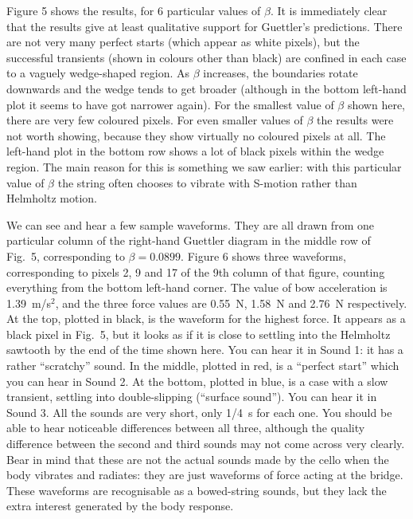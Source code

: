   Figure 5 shows the results, for 6 particular values of $\beta$. It is 
  immediately clear that the results give at least qualitative support for 
  Guettler's predictions. There are not very many perfect starts (which appear 
  as white pixels), but the successful transients (shown in colours other than 
  black) are confined in each case to a vaguely wedge-shaped region. As $\beta$ 
  increases, the boundaries rotate downwards and the wedge tends to get broader 
  (although in the bottom left-hand plot it seems to have got narrower again). 
  For the smallest value of $\beta$ shown here, there are very few coloured 
  pixels. For even smaller values of $\beta$ the results were not worth 
  showing, because they show virtually no coloured pixels at all. The left-hand 
  plot in the bottom row shows a lot of black pixels within the wedge region. 
  The main reason for this is something we saw earlier: with this particular 
  value of $\beta$ the string often chooses to vibrate with S-motion rather 
  than Helmholtz motion. 







  We can see and hear a few sample waveforms. They are all drawn from one 
  particular column of the right-hand Guettler diagram in the middle row of 
  Fig.\ 5, corresponding to $\beta=0.0899$. Figure 6 shows three waveforms, 
  corresponding to pixels 2, 9 and 17 of the 9th column of that figure, 
  counting everything from the bottom left-hand corner. The value of bow 
  acceleration is 1.39~m/s$^2$, and the three force values are 0.55~N, 1.58~N 
  and 2.76~N respectively. At the top, plotted in black, is the waveform for 
  the highest force. It appears as a black pixel in Fig.\ 5, but it looks as if 
  it is close to settling into the Helmholtz sawtooth by the end of the time 
  shown here. You can hear it in Sound 1: it has a rather ``scratchy'' sound. 
  In the middle, plotted in red, is a ``perfect start'' which you can hear in 
  Sound 2. At the bottom, plotted in blue, is a case with a slow transient, 
  settling into double-slipping (``surface sound''). You can hear it in Sound 
  3. All the sounds are very short, only 1/4~s for each one. You should be able 
  to hear noticeable differences between all three, although the quality 
  difference between the second and third sounds may not come across very 
  clearly. Bear in mind that these are not the actual sounds made by the cello 
  when the body vibrates and radiates: they are just waveforms of force acting 
  at the bridge. These waveforms are recognisable as a bowed-string sounds, but 
  they lack the extra interest generated by the body response. 

